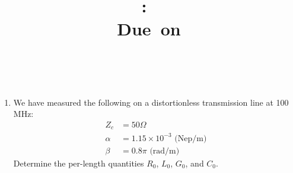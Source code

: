\documentclass{report}						%
\title{\vspace{2in}\textmd{\textbf{\hmwkClass:\ \hmwkTitle}}\\\normalsize\vspace{0.1in}\small{Due\ on\hmwkDueDate}\\\vspace{0.1in}\large{\textit{\hmwkClassInstructor\ \hmwkClassTime}}\vspace{3in}}
\date{}
\author{\textbf{\hmwkAuthorName}}
\begin{document}
\begin{spacing}{1.1}
\maketitle

\newpage
\begin{enumerate}
\item[{\bf \large 1.}] 
We have measured the following on a distortionless transmission line at 100 MHz:
\begin{align*}
Z_c&= 50\Omega\\
\alpha &= 1.15\times 10^{-3} \text{ (Nep/m)}\\
\beta &= 0.8\pi \text{ (rad/m)}
\end{align*}
Determine the per-length quantities $R_0$, $L_0$, $G_0$, and $C_0$.


\end{enumerate}
\end{spacing}
\end{document}
